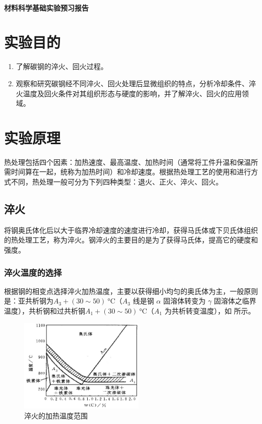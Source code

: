 \documentclass[a4paper,utf8]{article}
\begin{document}
\begin{center}
    {\mbox{}\\[7em]\bfseries\songti%
    材料科学基础实验预习报告}\\[34mm]
\end{center}\newpage
\section{实验目的}
    \begin{enumerate}
        \item 了解碳钢的淬火、回火过程。
        \item 观察和研究碳钢经不同淬火、回火处理后显微组织的特点，分析冷却条件、淬火温度及回火条件对其组织形态与硬度的影响，并了解淬火、回火的应用领域。
    \end{enumerate}
\section{实验原理}%
    热处理包括四个因素：加热速度、最高温度、加热时间（通常将工件升温和保温所需时间算在一起，统称为加热时间）和冷却速度。根据热处理工艺的使用和进行方式不同，热处理一般可分为下列四种类型：退火、正火、淬火、回火。\par
    \subsection{淬火}
        将钢奥氏体化后以大于临界冷却速度的速度进行冷却，获得马氏体或下贝氏体组织的热处理工艺，称为淬火。钢淬火的主要目的是为了获得马氏体，提高它的硬度和强度。
        \subsubsection{淬火温度的选择}
            根据钢的相变点选择淬火加热温度，主要以获得细小均匀的奥氏体为主，一般原则是：亚共析钢为$A_{3}+(30{\sim}50)~\unit{\degreeCelsius}$（$A_3$ 线是钢 $\alpha$ 固溶体转变为 $\gamma$ 固溶体之临界温度），共析钢和过共析钢$A_{1}+(30{\sim}50)~\unit{\degreeCelsius}$（$A_1$ 为共析转变温度），如 所示。
            \begin{figure}[!ht]
                \caption{淬火的加热温度范围\label{fig:1}}
                \includegraphics[width=60mm]{fig1.jpg}
            \end{figure}
\end{document}
